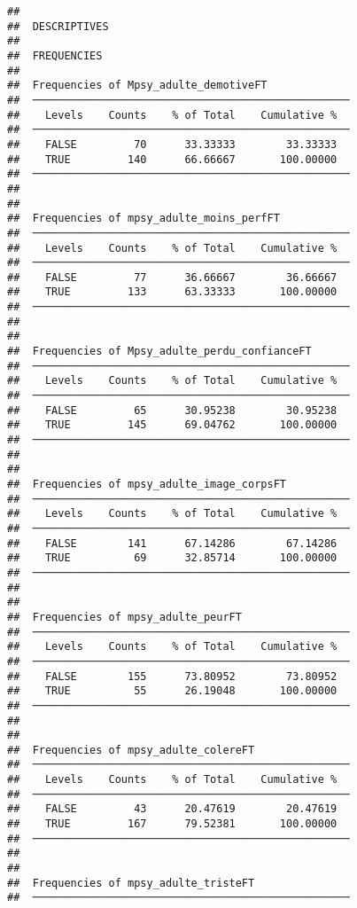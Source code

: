 \documentclass[
]{article}
\begin{document}
\begin{verbatim}
## 
##  DESCRIPTIVES
## 
##  FREQUENCIES
## 
##  Frequencies of Mpsy_adulte_demotiveFT              
##  ────────────────────────────────────────────────── 
##    Levels    Counts    % of Total    Cumulative %   
##  ────────────────────────────────────────────────── 
##    FALSE         70      33.33333        33.33333   
##    TRUE         140      66.66667       100.00000   
##  ────────────────────────────────────────────────── 
## 
## 
##  Frequencies of mpsy_adulte_moins_perfFT            
##  ────────────────────────────────────────────────── 
##    Levels    Counts    % of Total    Cumulative %   
##  ────────────────────────────────────────────────── 
##    FALSE         77      36.66667        36.66667   
##    TRUE         133      63.33333       100.00000   
##  ────────────────────────────────────────────────── 
## 
## 
##  Frequencies of Mpsy_adulte_perdu_confianceFT       
##  ────────────────────────────────────────────────── 
##    Levels    Counts    % of Total    Cumulative %   
##  ────────────────────────────────────────────────── 
##    FALSE         65      30.95238        30.95238   
##    TRUE         145      69.04762       100.00000   
##  ────────────────────────────────────────────────── 
## 
## 
##  Frequencies of mpsy_adulte_image_corpsFT           
##  ────────────────────────────────────────────────── 
##    Levels    Counts    % of Total    Cumulative %   
##  ────────────────────────────────────────────────── 
##    FALSE        141      67.14286        67.14286   
##    TRUE          69      32.85714       100.00000   
##  ────────────────────────────────────────────────── 
## 
## 
##  Frequencies of mpsy_adulte_peurFT                  
##  ────────────────────────────────────────────────── 
##    Levels    Counts    % of Total    Cumulative %   
##  ────────────────────────────────────────────────── 
##    FALSE        155      73.80952        73.80952   
##    TRUE          55      26.19048       100.00000   
##  ────────────────────────────────────────────────── 
## 
## 
##  Frequencies of mpsy_adulte_colereFT                
##  ────────────────────────────────────────────────── 
##    Levels    Counts    % of Total    Cumulative %   
##  ────────────────────────────────────────────────── 
##    FALSE         43      20.47619        20.47619   
##    TRUE         167      79.52381       100.00000   
##  ────────────────────────────────────────────────── 
## 
## 
##  Frequencies of mpsy_adulte_tristeFT                
##  ────────────────────────────────────────────────── 

\end{verbatim}
\end{document}
